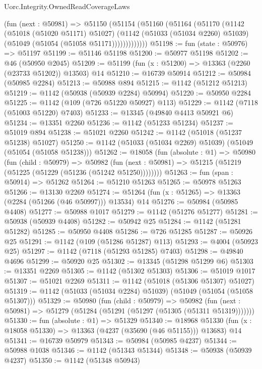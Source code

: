 \begin{lexlean}{Uorc.Integrity.OwnedReadCoverageLaws}
\begin{coremodule}
          (fun (next : @50981) =>
          @51150
            (@51154
              (@51160
                (@51164
                  (@51170
                    (@1142
                      (@51018 (@51020 @51171) @51027)
                      (@1142
                        (@51033 (@51034 @2260) @51039)
                        (@51049 (@51054 (@51058 @51171)))))))))))))
@51198 := fun (state : @50976) => @51197
@51199 := @51146 @51198
@51200 := @50977 @51198
@51202 := @46 (@50950 @2045)
@51209 := @51199 (fun (x : @51200) => @13363 (@2260 (@23733 @51202)) @13503) @14
@51210 := @16739 @50914
@51212 := @50984 (@50985 @2284)
@51213 := @50988 @894
@51215 := @1142 (@51212 @51213)
@51219 := @1142 (@50938 (@50939 @2284) @50994)
@51220 := @50950 @2284
@51225 := @1142 (@109 (@726 @51220 @50927) @113)
@51229 := @1142 (@7118 (@51003 @51220) @7403)
@51233 := @13345 (@49840 @4413 @50921 @6)
@51234 := @13351 @2260
@51236 := @1142 (@51233 @51234)
@51237 := @51019 @894
@51238 := @51021 @2260
@51242 := @1142 (@51018 (@51237 @51238) @51027)
@51250 := @1142 (@51033 (@51034 @2269) @51039) (@51049 (@51054 (@51058 @51238)))
@51262 := @18058
    (fun (absolute : @1) =>
    @50980
      (fun (child : @50979) =>
      @50982 (fun (next : @50981) => @51215 (@51219 (@51225 (@51229 (@51236 (@51242 @51250))))))))
@51263 := fun (span : @50914) => @51262
@51264 := @51210 @51263
@51265 := @50978 @51263
@51266 := @13130 @2269
@51274 := @51264 (fun (x : @51265) => @13363 (@2284 (@51266 (@46 @50997))) @13534) @14
@51276 := @50984 (@50985 @4408)
@51277 := @50988 @1017
@51279 := @1142 (@51276 @51277)
@51281 := @50938 (@50939 @4408)
@51282 := @50942 @25
@51284 := @1142 (@51281 @51282)
@51285 := @50950 @4408
@51286 := @726 @51285
@51287 := @50926 @25
@51291 := @1142 (@109 (@51286 @51287) @113)
@51293 := @4004 (@50923 @25)
@51297 := @1142 (@7118 (@51293 @51285) @7403)
@51298 := @49840 @4696
@51299 := @50920 @25
@51302 := @13345 (@51298 @51299 @6)
@51303 := @13351 @2269
@51305 := @1142 (@51302 @51303)
@51306 := @51019 @1017
@51307 := @51021 @2269
@51311 := @1142 (@51018 (@51306 @51307) @51027)
@51319 := @1142 (@51033 (@51034 @2284) @51039) (@51049 (@51054 (@51058 @51307)))
@51329 := @50980
    (fun (child : @50979) =>
    @50982 (fun (next : @50981) => @51279 (@51284 (@51291 (@51297 (@51305 (@51311 @51319)))))))
@51330 := fun (absolute : @1) => @51329
@51340 := @18968 @51330 (fun (x : @18058 @51330) => @13363 (@4237 (@35690 (@46 @51155))) @13683) @14
@51341 := @16739 @50979
@51343 := @50984 (@50985 @4237)
@51344 := @50988 @1038
@51346 := @1142 (@51343 @51344)
@51348 := @50938 (@50939 @4237)
@51350 := @1142 (@51348 @50943)

\end{coremodule}
\end{lexlean}
